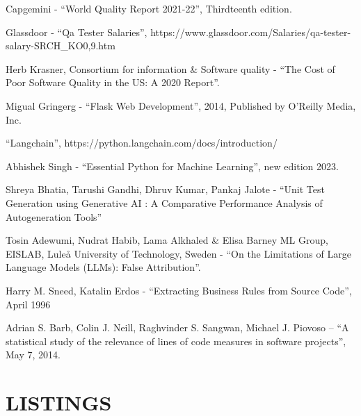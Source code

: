 \documentclass[12pt, twoside]{report}
\makeatletter
\newcommand\AppendixName{Appendix}
\let\oldappendix\appendix
\renewcommand{\appendix}{%
  \oldappendix
  \renewcommand{\chaptername}{\AppendixName}  \renewcommand{\thechapter}{\@Alph\c@chapter}}
\makeatother
\begin{document}
\begin{thebibliography}{9}
Capgemini - “World Quality Report 2021-22”, Thirdteenth edition.

Glassdoor - “Qa Tester Salaries”, https://www.glassdoor.com/Salaries/qa-tester-salary-SRCH\_KO0,9.htm 

Herb Krasner, Consortium for information \& Software quality - ``The Cost of Poor Software Quality in the US: A 2020 Report''.

Migual Gringerg - “Flask Web Development”, 2014, Published by O'Reilly Media, Inc.

“Langchain”, https://python.langchain.com/docs/introduction/ 

Abhishek Singh - “Essential Python for Machine Learning”, new edition 2023.

Shreya Bhatia, Tarushi Gandhi, Dhruv Kumar, Pankaj Jalote - “Unit Test Generation using Generative AI : A Comparative Performance Analysis of Autogeneration Tools”

Tosin Adewumi, Nudrat Habib, Lama Alkhaled \& Elisa Barney ML Group, EISLAB, Luleå University of Technology, Sweden - “On the Limitations of Large Language Models (LLMs): False Attribution”.


Harry M. Sneed, Katalin Erdos - “Extracting Business Rules from Source Code”, April 1996

Adrian S. Barb, Colin J. Neill, Raghvinder S. Sangwan, Michael J. Piovoso – “A statistical study of the relevance of lines of code measures in software projects”, May 7, 2014.

\end{thebibliography}

\appendix
\chapter{LISTINGS}

\end{document}
